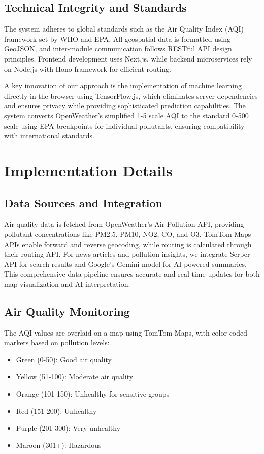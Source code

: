 \documentclass[conference]{IEEEtran}
\begin{document}
\subsection{Technical Integrity and Standards}
The system adheres to global standards such as the Air Quality Index (AQI) framework set by WHO and EPA. All geospatial data is formatted using GeoJSON, and inter-module communication follows RESTful API design principles. Frontend development uses Next.js, while backend microservices rely on Node.js with Hono framework for efficient routing.

A key innovation of our approach is the implementation of machine learning directly in the browser using TensorFlow.js, which eliminates server dependencies and ensures privacy while providing sophisticated prediction capabilities. The system converts OpenWeather's simplified 1-5 scale AQI to the standard 0-500 scale using EPA breakpoints for individual pollutants, ensuring compatibility with international standards.

\section{Implementation Details}

\subsection{Data Sources and Integration}
Air quality data is fetched from OpenWeather's Air Pollution API, providing pollutant concentrations like PM2.5, PM10, NO2, CO, and O3. TomTom Maps APIs enable forward and reverse geocoding, while routing is calculated through their routing API. For news articles and pollution insights, we integrate Serper API for search results and Google's Gemini model for AI-powered summaries. This comprehensive data pipeline ensures accurate and real-time updates for both map visualization and AI interpretation.

\subsection{Air Quality Monitoring}
The AQI values are overlaid on a map using TomTom Maps, with color-coded markers based on pollution levels:
\begin{itemize}
    \item Green (0-50): Good air quality
    \item Yellow (51-100): Moderate air quality
    \item Orange (101-150): Unhealthy for sensitive groups
    \item Red (151-200): Unhealthy
    \item Purple (201-300): Very unhealthy
    \item Maroon (301+): Hazardous
\end{itemize}
\end{document}
